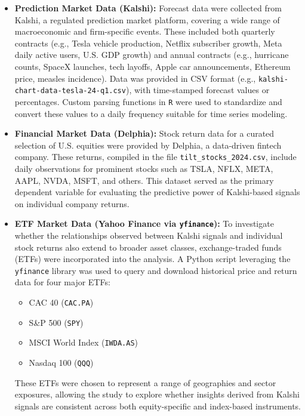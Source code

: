 \documentclass[12pt]{report}
\begin{document}
\begin{itemize}
    \item \textbf{Prediction Market Data (Kalshi):} Forecast data were collected from Kalshi, a regulated prediction market platform, covering a wide range of macroeconomic and firm-specific events. These included both quarterly contracts (e.g., Tesla vehicle production, Netflix subscriber growth, Meta daily active users, U.S. GDP growth) and annual contracts (e.g., hurricane counts, SpaceX launches, tech layoffs, Apple car announcements, Ethereum price, measles incidence). Data was provided in CSV format (e.g., \texttt{kalshi-chart-data-tesla-24-q1.csv}), with time-stamped forecast values or percentages. Custom parsing functions in \texttt{R} were used to standardize and convert these values to a daily frequency suitable for time series modeling.

    \item \textbf{Financial Market Data (Delphia):} Stock return data for a curated selection of U.S. equities were provided by Delphia, a data-driven fintech company. These returns, compiled in the file \texttt{tilt\_stocks\_2024.csv}, include daily observations for prominent stocks such as TSLA, NFLX, META, AAPL, NVDA, MSFT, and others. This dataset served as the primary dependent variable for evaluating the predictive power of Kalshi-based signals on individual company returns.

    \item \textbf{ETF Market Data (Yahoo Finance via \texttt{yfinance}):} To investigate whether the relationships observed between Kalshi signals and individual stock returns also extend to broader asset classes, exchange-traded funds (ETFs) were incorporated into the analysis. A Python script leveraging the \texttt{yfinance} library was used to query and download historical price and return data for four major ETFs:
    \begin{itemize}
        \item CAC 40 (\texttt{CAC.PA})
        \item S\&P 500 (\texttt{SPY})
        \item MSCI World Index (\texttt{IWDA.AS})
        \item Nasdaq 100 (\texttt{QQQ})
    \end{itemize}
    These ETFs were chosen to represent a range of geographies and sector exposures, allowing the study to explore whether insights derived from Kalshi signals are consistent across both equity-specific and index-based instruments.
\end{itemize}
\end{document}
